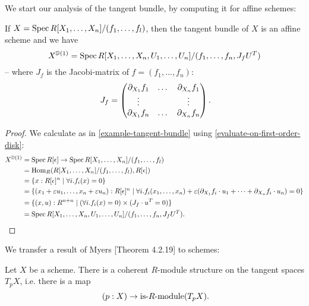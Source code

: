 We start our analysis of the tangent bundle,
by computing it for affine schemes:

\begin{lemma}%
  If $X=\operatorname{Spec} R[X_1,\dots,X_n]/(f_1,\dots,f_l)$,
  then the tangent bundle of $X$ is an affine scheme and we have
  \[
    X^{\mathbb{D}(1)}=\operatorname{Spec} R[X_1,\dots,X_n,U_1,\dots,U_n]/(f_1,\dots,f_n,J_f U^T)
  \]
  -- where $J_f$ is the Jacobi-matrix of $f=(f_1,\dots,f_n)$:
  \[
    J_f=
    \left(
    \begin{matrix}
      \partial_{X_1}f_1 & \dots & \partial_{X_n}f_1 \\
      \vdots &  & \vdots \\
      \partial_{X_1}f_n & \dots & \partial_{X_n}f_n 
    \end{matrix}
  \right)
  \rlap{.}
  \]
\end{lemma}

\begin{proof}
  We calculate as in \cref{example-tangent-bundle} using \cref{evaluate-on-first-order-disk}:
  \begin{align*}
    X^{\D(1)}&= \Spec R[\epsilon] \to \Spec R[X_1,\dots,X_n]/(f_1,\dots,f_l)\\
             &= \Hom_R(R[X_1,\dots,X_n]/(f_1,\dots,f_l),R[\epsilon]) \\
             &= \{ x:R[\epsilon]^n \mid \forall i. f_i(x)=0 \} \\
             &= \{ (x_1+\varepsilon u_1, \dots , x_n+\varepsilon u_n):R[\epsilon]^n \mid \forall i. f_i(x_1,\dots,x_n)+\varepsilon(\partial_{X_1}f_i\cdot u_1+\dots+\partial_{X_n}f_i\cdot u_n) =0 \} \\
             &= \{ (x,u):R^{n+n}\mid (\forall i . f_i(x)=0) \times (J_f\cdot u^T=0) \} \\
             &= \Spec R[X_1,\dots,X_n,U_1,\dots,U_n]/(f_1,\dots,f_n,J_f U^T)
               \rlap{.}
  \end{align*}
\end{proof}

We transfer a result of Myers \cite{david-orbifolds}[Theorem 4.2.19] to schemes:

\begin{theorem}%
  Let $X$ be a scheme.
  There is a coherent $R$-module structure on the tangent spaces $T_pX$,
  i.e. there is a map
  \[ (p:X)\to \text{is-$R$-module}(T_pX)\rlap{.}\]
\end{theorem}

